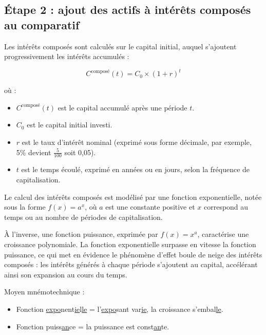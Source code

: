 \documentclass{article}
\begin{document}
\subsection*{Étape 2 : ajout des actifs à intérêts composés au comparatif}
\begin{tcolorbox}[
    colback=lightgreen, 
    colframe=lightgreen, 
    boxrule=0.5pt, 
    arc=0pt, 
    left=10pt, 
    right=10pt, 
    top=6pt, 
    bottom=6pt, 
    boxsep=2pt, 
    before upper={\faLightbulb\hspace{10pt}}
]
    Les intérêts composés sont calculés sur le capital initial, auquel s'ajoutent progressivement les intérêts accumulés :
    

    \[
    C^{\text{composé}}(t) = C_0 \times (1 + r)^t
    \]
    
    où :
    \begin{itemize}
        \item \( C^{\text{composé}}(t) \) est le capital accumulé après une période \( t \).
        \item \( C_0 \) est le capital initial investi.
        \item \( r \) est le taux d'intérêt nominal (exprimé sous forme décimale, par exemple, 5\% devient $\frac{5}{100}$ soit 0,05).
        \item \( t \) est le temps écoulé, exprimé en années ou en jours, selon la fréquence de capitalisation.
    \end{itemize}
\end{tcolorbox}

\begin{tcolorbox}[
    colback=lightgreen, 
    colframe=lightgreen, 
    boxrule=0.5pt, 
    arc=0pt, 
    left=10pt, 
    right=10pt, 
    top=6pt, 
    bottom=6pt, 
    boxsep=2pt, 
    before upper={\faLightbulb\hspace{10pt}}
]
    Le calcul des intérêts composés est modélisé par une fonction exponentielle, notée sous la forme $f(x)=a^x$, où $a$ est une constante positive et $x$ correspond au temps ou au nombre de périodes de capitalisation.

    À l'inverse, une fonction puissance, exprimée par $f(x)=x^a$, caractérise une croissance polynomiale. La fonction exponentielle surpasse en vitesse la fonction puissance, ce qui met en évidence le phénomène d'effet boule de neige des intérêts composés : les intérêts générés à chaque période s'ajoutent au capital, accélérant ainsi son expansion au cours du temps.

    Moyen mnémotechnique : 
    \begin{itemize}
        \item Fonction \underline{expo}nent\underline{ie}l\underline{le} = l'\underline{expo}sant var\underline{ie}, la croissance s'embal\underline{le}.
        \item Fonction puiss\underline{an}ce = la puissance est const\underline{an}te.
    \end{itemize}

\end{tcolorbox}
\end{document}
